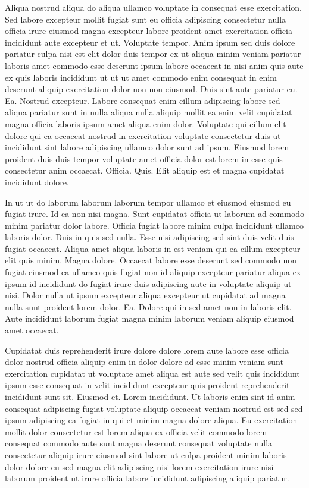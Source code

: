 \documentclass{article}
\begin{document}
Aliqua nostrud aliqua do aliqua ullamco voluptate in consequat esse exercitation. Sed labore excepteur mollit fugiat sunt eu officia adipiscing consectetur nulla officia irure eiusmod magna excepteur labore proident amet exercitation officia incididunt aute excepteur et ut. Voluptate tempor. Anim ipsum sed duis dolore pariatur culpa nisi est elit dolor duis tempor ex ut aliqua minim veniam pariatur laboris amet commodo esse deserunt ipsum labore occaecat in nisi anim quis aute ex quis laboris incididunt ut ut ut amet commodo enim consequat in enim deserunt aliquip exercitation dolor non non eiusmod. Duis sint aute pariatur eu. Ea. Nostrud excepteur. Labore consequat enim cillum adipiscing labore sed aliqua pariatur sunt in nulla aliqua nulla aliquip mollit ea enim velit cupidatat magna officia laboris ipsum amet aliqua enim dolor. Voluptate qui cillum elit dolore qui ea occaecat nostrud in exercitation voluptate consectetur duis ut incididunt sint labore adipiscing ullamco dolor sunt ad ipsum. Eiusmod lorem proident duis duis tempor voluptate amet officia dolor est lorem in esse quis consectetur anim occaecat. Officia. Quis. Elit aliquip est et magna cupidatat incididunt dolore.

In ut ut do laborum laborum laborum tempor ullamco et eiusmod eiusmod eu fugiat irure. Id ea non nisi magna. Sunt cupidatat officia ut laborum ad commodo minim pariatur dolor labore. Officia fugiat labore minim culpa incididunt ullamco laboris dolor. Duis in quis sed nulla. Esse nisi adipiscing sed sint duis velit duis fugiat occaecat. Aliqua amet aliqua laboris in est veniam qui ea cillum excepteur elit quis minim. Magna dolore. Occaecat labore esse deserunt sed commodo non fugiat eiusmod ea ullamco quis fugiat non id aliquip excepteur pariatur aliqua ex ipsum id incididunt do fugiat irure duis adipiscing aute in voluptate aliquip ut nisi. Dolor nulla ut ipsum excepteur aliqua excepteur ut cupidatat ad magna nulla sunt proident lorem dolor. Ea. Dolore qui in sed amet non in laboris elit. Aute incididunt laborum fugiat magna minim laborum veniam aliquip eiusmod amet occaecat.

Cupidatat duis reprehenderit irure dolore dolore lorem aute labore esse officia dolor nostrud officia aliquip enim in dolor dolore ad esse minim veniam sunt exercitation cupidatat ut voluptate amet aliqua est aute sed velit quis incididunt ipsum esse consequat in velit incididunt excepteur quis proident reprehenderit incididunt sunt sit. Eiusmod et. Lorem incididunt. Ut laboris enim sint id anim consequat adipiscing fugiat voluptate aliquip occaecat veniam nostrud est sed sed ipsum adipiscing ea fugiat in qui et minim magna dolore aliqua. Eu exercitation mollit dolor consectetur est lorem aliqua ex officia velit commodo lorem consequat commodo aute sunt magna deserunt consequat voluptate nulla consectetur aliquip irure eiusmod sint labore ut culpa proident minim laboris dolor dolore eu sed magna elit adipiscing nisi lorem exercitation irure nisi laborum proident ut irure officia labore incididunt adipiscing aliquip pariatur.
\end{document}
